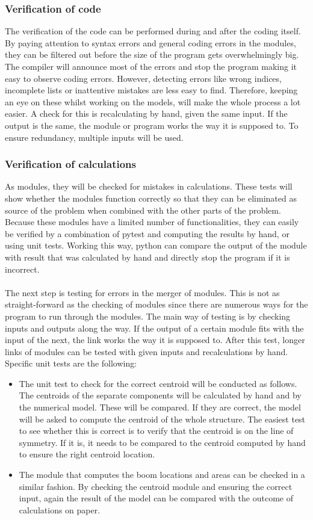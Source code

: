 \subsubsection{Verification of code} The verification of the code can be performed during and after the coding itself. By paying attention to syntax errors and general coding errors in the modules, they can be filtered out before the size of the program gets overwhelmingly big. The compiler will announce most of the errors and stop the program making it easy to observe coding errors. However, detecting errors like wrong indices, incomplete lists or inattentive mistakes are less easy to find. Therefore, keeping an eye on these whilst working on the models, will make the whole process a lot easier. A check for this is recalculating by hand, given the same input. If the output is the same, the module or program works the way it is supposed to. To ensure redundancy, multiple inputs will be used.
\subsubsection{Verification of calculations}
As modules, they will be checked for mistakes in calculations. These tests will show whether the modules function correctly so that they can be eliminated as source of the problem when combined with the other parts of the problem. Because these modules have a limited number of functionalities, they can easily be verified by a combination of pytest and computing the results by hand, or using unit tests. Working this way, python can compare the output of the module with result that was calculated by hand and directly stop the program if it is incorrect.\\ \\
The next step is testing for errors in the merger of modules. This is not as straight-forward as the checking of modules since there are numerous ways for the program to run through the modules. The main way of testing is by checking inputs and outputs along the way. If the output of a certain module fits with the input of the next, the link works the way it is supposed to. After this test, longer links of modules can be tested with given inputs and recalculations by hand. 
Specific unit tests are the following:\\
\begin{itemize}
    \item The unit test to check for the correct centroid will be conducted as follows. The centroids of the separate components will be calculated by hand and by the numerical model. These will be compared. If they are correct, the model will be asked to compute the centroid of the whole structure. The easiest test to see whether this is correct is to verify that the centroid is on the line of symmetry. If it is, it needs to be compared to the centroid computed by hand to ensure the right centroid location. 
    \item The module that computes the boom locations and areas can be checked in a similar fashion. By checking the centroid module and ensuring the correct input, again the result of the model can be compared with the outcome of calculations on paper. 
\end{itemize}

